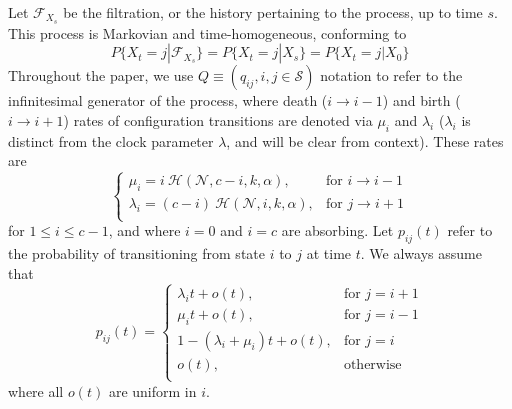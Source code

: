 \documentclass[letterpaper,twocolumn,10pt]{article}
\theoremstyle{definition}
\begin{document}
\begin{appendices}
Let $\mathcal{F}_{X_s}$ be the filtration, or the history pertaining to the process, up to time $s$. This process is Markovian and time-homogeneous, conforming to 
\[
    P\{X_t = j | \mathcal{F}_{X_s}\} = P\{X_t = j | X_s\} = P\{X_t = j | X_0\}    
\]
Throughout the paper, we use $Q \equiv (q_{ij}, i, j \in \mathcal{S})$ notation to refer to the infinitesimal generator of the process, where death ($i \rightarrow i-1$) and birth ($i \rightarrow i+1$) rates of configuration transitions are denoted via $\mu_i$ and $\lambda_i$ ($\lambda_ i$ is distinct from the clock parameter $\lambda$, and will be clear from context). These rates are 
\[
    \begin{cases}
        \mu_i = i\ \mathcal{H}(\mathcal{N}, c-i, k, \alpha), & \text{for } i \rightarrow i - 1 \\
        \lambda_i = (c-i)\ \mathcal{H}(\mathcal{N}, i, k, \alpha), & \text{for } j \rightarrow i + 1 \\
    \end{cases}
\]
for $1\leq i\leq c-1$, and where $i = 0$ and $i = c$ are absorbing. Let $p_{ij}(t)$ refer to the probability of transitioning from state $i$ to $j$ at time $t$. 
We always assume that 
\[
    p_{ij}(t) = 
    \begin{cases}
      \lambda_it + o(t), & \text{for } j = i + 1 \\
      \mu_it + o(t), & \text{for } j = i - 1 \\
      1 - (\lambda_i + \mu_i)t + o(t), & \text{for } j = i \\
      o(t), & \text{otherwise }\\
    \end{cases}
\]
where all $o(t)$ are uniform in $i$. 


\end{appendices}
\end{document}
